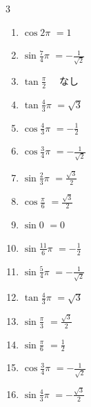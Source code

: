 \begin{multicols}{3}
\begin{enumerate}
  \item $\displaystyle \cos{2\pi}$
        $\displaystyle =1$

  \item $\displaystyle \sin{\frac{7}{4}\pi}$
        $\displaystyle =-\frac{1}{\sqrt{2}}$

  \item $\displaystyle \tan{\frac{\pi}{2}}$
        $\displaystyle \quad なし$

  \item $\displaystyle \tan{\frac{4}{3}\pi}$
        $\displaystyle =\sqrt{3}$

  \item $\displaystyle \cos{\frac{4}{3}\pi}$
        $\displaystyle =-\frac{1}{2}$

  \item $\displaystyle \cos{\frac{3}{4}\pi}$
        $\displaystyle =-\frac{1}{\sqrt{2}}$

  \item $\displaystyle \sin{\frac{2}{3}\pi}$
        $\displaystyle =\frac{\sqrt{3}}{2}$

  \item $\displaystyle \cos{\frac{\pi}{6}}$
        $\displaystyle =\frac{\sqrt{3}}{2}$

  \item $\displaystyle \sin{0}$
        $\displaystyle =0$

  \item $\displaystyle \sin{\frac{11}{6}\pi}$
        $\displaystyle =-\frac{1}{2}$

\columnbreak %

  \item $\displaystyle \sin{\frac{5}{4}\pi}$
        $\displaystyle =-\frac{1}{\sqrt{2}}$

  \item $\displaystyle \tan{\frac{4}{3}\pi}$
        $\displaystyle =\sqrt{3}$

  \item $\displaystyle \sin{\frac{\pi}{3}}$
        $\displaystyle =\frac{\sqrt{3}}{2}$

  \item $\displaystyle \sin{\frac{\pi}{6}}$
        $\displaystyle =\frac{1}{2}$

  \item $\displaystyle \cos{\frac{3}{4}\pi}$
        $\displaystyle =-\frac{1}{\sqrt{2}}$

  \item $\displaystyle \sin{\frac{4}{3}\pi}$
        $\displaystyle =-\frac{\sqrt{3}}{2}$


\end{enumerate}
\end{multicols}
